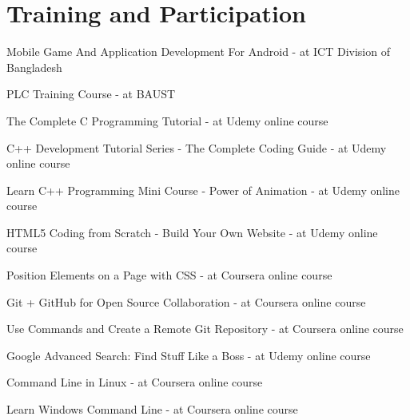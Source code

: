 \documentclass[a4paper,20pt]{article}
\begin{document}
\section{Training and Participation}
\begin{description}[font=$\bullet$]
\item {Mobile Game And Application Development For Android - at ICT Division of Bangladesh}
\vspace{-5pt}
\item {PLC Training Course - at BAUST}
\vspace{-5pt}
\item {The Complete C Programming Tutorial - at Udemy online course}
\vspace{-5pt}
\item {C++ Development Tutorial Series - The Complete Coding Guide - at Udemy online course }
\vspace{-5pt}
\item {Learn C++ Programming Mini Course - Power of Animation - at Udemy online course}
\vspace{-5pt}
\item {HTML5 Coding from Scratch - Build Your Own Website - at Udemy online course}
\vspace{-5pt}
\item {Position Elements on a Page with CSS - at Coursera online course }
\vspace{-5pt}
\item {Git + GitHub for Open Source Collaboration - at Coursera online course}
\vspace{-5pt}
\item {Use Commands and Create a Remote Git Repository - at Coursera online course}
\vspace{-5pt}
\item {Google Advanced Search: Find Stuff Like a Boss - at Udemy online course}
\vspace{-5pt}
\item {Command Line in Linux - at Coursera online course }
\vspace{-5pt}
\item {Learn Windows Command Line - at Coursera online course}

\end{description}

\vspace{5pt}
\end{document}
